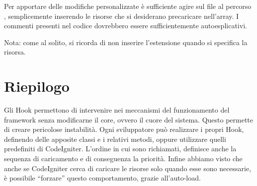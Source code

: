 Per apportare delle modifiche personalizzate è sufficiente agire sul file  al percorso , semplicemente inserendo le risorse che si desiderano precaricare nell'array. I commenti presenti nel codice dovrebbero essere sufficientemente autoesplicativi.

Nota: come al solito, si ricorda di non inserire l'estensione  quando si specifica la risorsa.

\section{Riepilogo}
Gli Hook permettono di intervenire nei meccanismi del funzionamento del framework senza modificarne il core, ovvero il cuore del sistema. Questo permette di creare pericolose instabilità. Ogni sviluppatore può realizzare i propri Hook, definendo delle apposite classi e i relativi metodi, oppure utilizzare quelli predefiniti di CodeIgniter. L'ordine in cui sono richiamati, definisce anche la sequenza di caricamento e di conseguenza la priorità. Infine abbiamo visto che anche se CodeIgniter cerca di caricare le risorse solo quando esse sono necessarie, è possibile ``forzare'' questo comportamento, grazie all'auto-load.